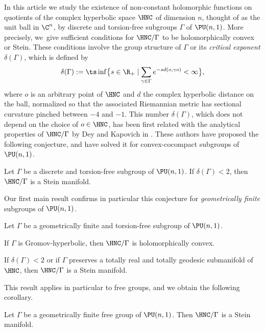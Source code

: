 In this article we study the existence of non-constant holomorphic functions on quotients of the complex hyperbolic space $\HNC$ of dimension $n$, thought of as the unit ball in $\C^{n}$, by discrete and torsion-free subgroups $\Gamma$ of $\PU(n,1)$. More precisely, we~give sufficient conditions for $\HNC/\Gamma$ to be holomorphically convex or Stein. These conditions involve the group structure of $\Gamma$ or its \textit{critical exponent} $\delta(\Gamma)$, which is defined by\begin{equation}\label{eq-def-delta}
\delta(\Gamma):= \ts\inf \bigl\{s \in \R_{+} \mid \sum_{\gamma \in \Gamma}e^{-sd(o,\gamma o)}< \infty\bigr\},
\end{equation}
where $o$ is an arbitrary point of $\HNC$ and $d$ the complex hyperbolic distance on the ball, normalized so that the associated Riemannian metric has sectional curvature pinched between $-4$ and $-1$. This number $\delta(\Gamma)$, which does not depend on the choice of $o\in \HNC$, has been first related with the analytical properties of $\HNC/\Gamma$ by Dey and Kapovich in \cite{deyNoteComplexhyperbolicKleinian2020}. These authors have proposed the following conjecture, and have solved it for convex-cocompact subgroups of $\PU(n,1)$.

\begin{conjecture*}
Let $\Gamma$ be a discrete and torsion-free subgroup of $\PU(n,1)$. If $\delta(\Gamma)<2$, then $\HNC/\Gamma$ is a Stein manifold.
\end{conjecture*}

Our first main result confirms in particular this conjecture for \textit{geometrically finite }subgroups of $\PU(n,1)$.

\begin{theoremIntro}\label{thm-geom-fini-delta-stein}
Let $\Gamma$ be a geometrically finite and torsion-free subgroup of $\PU(n,1)$.
\begin{enumeratea}
\item\label{thm-geom-fini-delta-steina} If $\Gamma$ is Gromov-hyperbolic, then $\HNC/\Gamma$ is holomorphically convex.
\item\label{thm-geom-fini-delta-steinb} If $\delta(\Gamma)<2$ or if $\Gamma$ preserves a totally real and totally geodesic submanifold of~$\HNC$, then $\HNC/\Gamma$ is a Stein manifold.
\end{enumeratea}
\end{theoremIntro}

This result applies in particular to free groups, and we obtain the following corollary.
\begin{corollaryIntro}\label{cor-free}
Let $\Gamma$ be a geometrically finite free group of $\PU(n,1)$. Then $\HNC/\Gamma$ is a Stein manifold.
\end{corollaryIntro}


